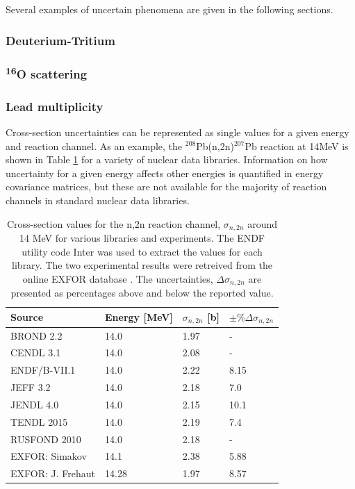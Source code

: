 \cite{Forrest2011}
Several examples of uncertain phenomena are given in the following sections.

\subsubsection{Deuterium-Tritium}
\subsubsection{\textsuperscript{16}O scattering}
\subsubsection{Lead multiplicity}

Cross-section uncertainties can be represented as single values for a given energy and reaction channel. As an example, the $^{208}$Pb(n,2n)$^{207}$Pb reaction at 14MeV is shown in Table \ref{tab:lead_by_lib} for a variety of nuclear data libraries. Information on how uncertainty for a given energy affects other energies is quantified in energy covariance matrices, but these are not available for the majority of reaction channels in standard nuclear data libraries.

\begin{table}[ht]
  \footnotesize
  \centering
  \begin{tabularx}{\textwidth}{XXXX}
    \toprule
    Source & Energy [MeV] & $\sigma_{n,2n}$ [b] & $\pm\%\Delta\sigma_{n,2n}$ \\
    \midrule
    BROND 2.2 & 14.0 & 1.97 & - \\
    CENDL 3.1 & 14.0 & 2.08 & - \\
    ENDF/B-VII.1 & 14.0 & 2.22 & 8.15 \\
    JEFF 3.2 & 14.0 & 2.18 & 7.0 \\
    JENDL 4.0 & 14.0 & 2.15 & 10.1 \\
    TENDL 2015 & 14.0 & 2.19 & 7.4 \\
    RUSFOND 2010 & 14.0 & 2.18 & - \\
    EXFOR: Simakov & 14.1 & 2.38 & 5.88 \\
    EXFOR: J. Frehaut & 14.28 & 1.97 & 8.57 \\
    \bottomrule
  \end{tabularx}
  \caption{Cross-section values for the n,2n reaction channel, $\sigma_{n,2n}$ around 14 MeV for various libraries and experiments. The ENDF utility code Inter \cite{Dunford2002} was used to extract the values for each library. The two experimental results were retreived from the online EXFOR database \cite{exfor2017}. The uncertainties, $\Delta\sigma_{n,2n}$ are presented as percentages above and below the reported value.}
  \label{tab:lead_by_lib}
\end{table}

